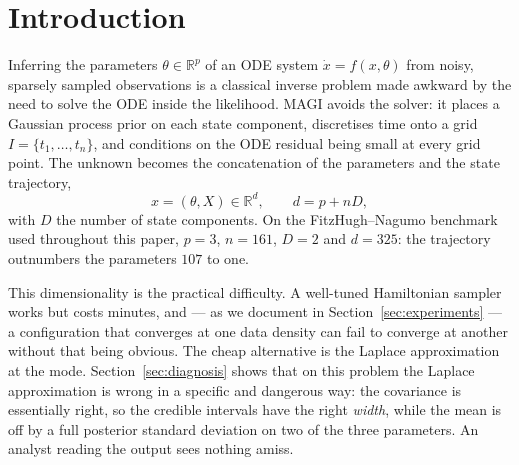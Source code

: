 \documentclass[11pt]{article}
\newcommand{\R}{\mathbb{R}}
\theoremstyle{plain}
\theoremstyle{definition}
\theoremstyle{remark}
\begin{document}
\begin{abstract}
We report several negative results, including that Stein variational gradient descent does not
merely converge slowly here: started \emph{at} a correct answer it moves away from it, degrading
energy distance by a factor of $45$--$80$ while holding marginal standard deviations at $0.99$ of
the reference. Follow-up work reproduces that to three significant figures and locates the cause,
which is not specific to this posterior: the collapse is dimensional, and the bandwidth rule the
method ships with makes it a factor of $0.582K/\ln K$ worse than the rule it is usually credited
with. A corrected configuration exists and brings the ensemble to the reference's own agreement
floor, but it degrades the parameter estimates on two of three systems, and for a reason that turns
out to be this paper's subject: SVGD's fixed point is exact for a Gaussian target and, on one that
is not, sits displaced along the axis from the joint mode to the posterior mean --- the very
correction we spend the paper computing.
\end{abstract}

\section{Introduction}

Inferring the parameters $\theta \in \R^{p}$ of an ODE system $\dot x = f(x,\theta)$ from noisy,
sparsely sampled observations is a classical inverse problem made awkward by the need to solve the
ODE inside the likelihood. MAGI \cite{yang2021} avoids the solver: it places a Gaussian process
prior on each state component, discretises time onto a grid $I = \{t_1,\dots,t_n\}$, and conditions
on the ODE residual being small at every grid point. The unknown becomes the concatenation of the
parameters and the state trajectory,
\[
  x = (\theta, X) \in \R^{d}, \qquad d = p + nD,
\]
with $D$ the number of state components. On the FitzHugh--Nagumo benchmark used throughout this
paper, $p=3$, $n=161$, $D=2$ and $d = 325$: the trajectory outnumbers the parameters $107$ to one.

This dimensionality is the practical difficulty. A well-tuned Hamiltonian sampler works but costs
minutes, and --- as we document in Section~\ref{sec:experiments} --- a configuration that converges
at one data density can fail to converge at another without that being obvious. The cheap
alternative is the Laplace approximation at the mode. Section~\ref{sec:diagnosis} shows that on
this problem the Laplace approximation is wrong in a specific and dangerous way: the covariance is
essentially right, so the credible intervals have the right \emph{width}, while the mean is off by
a full posterior standard deviation on two of the three parameters. An analyst reading the output
sees nothing amiss.
\end{document}
